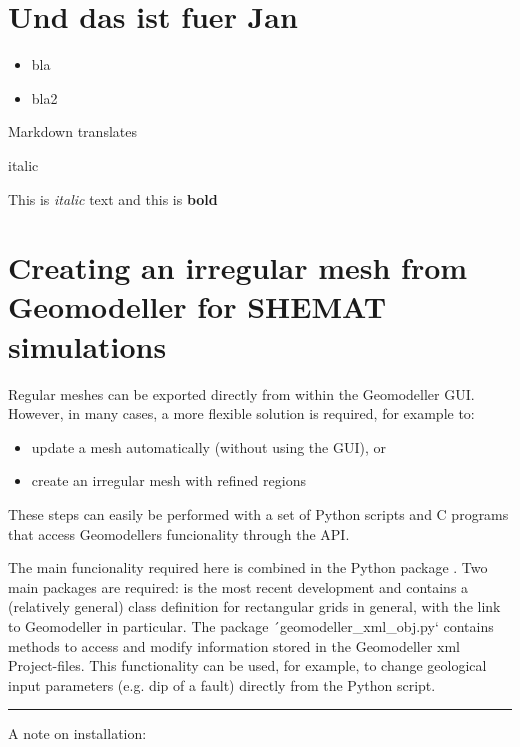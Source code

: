 \documentclass[letterpaper,10pt,english]{sphinxmanual}
\begin{document}
\chapter{Und das ist fuer Jan}
\label{3D-Structural-Data:und-das-ist-fuer-jan}\begin{itemize}
\item {} 
bla

\item {} 
bla2

\end{itemize}

Markdown translates

italic

This is \emph{italic} text and this is \textbf{bold}


\chapter{Creating an irregular mesh from Geomodeller for SHEMAT simulations}
\label{Geomodeller-Export::doc}\label{Geomodeller-Export:creating-an-irregular-mesh-from-geomodeller-for-shemat-simulations}
Regular meshes can be exported directly from within the Geomodeller GUI.
However, in many cases, a more flexible solution is required, for
example to:
\begin{itemize}
\item {} 
update a mesh automatically (without using the GUI), or

\item {} 
create an irregular mesh with refined regions

\end{itemize}

These steps can easily be performed with a set of Python scripts and C
programs that access Geomodellers funcionality through the API.

The main funcionality required here is combined in the Python package
. Two main packages are required:  is the most
recent development and contains a (relatively general) class definition
for rectangular grids in general, with the link to Geomodeller in
particular. The package ´geomodeller\_xml\_obj.py{}` contains methods to
access and modify information stored in the Geomodeller xml
Project-files. This functionality can be used, for example, to change
geological input parameters (e.g. dip of a fault) directly from the
Python script.


\bigskip\hrule{}\bigskip


A note on installation:
\end{document}
